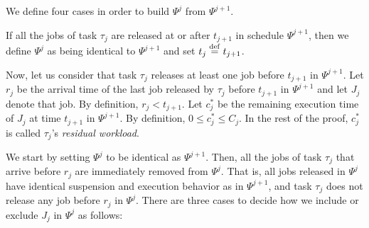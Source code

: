 
We define four cases in order to build $\Psi^j$ from $\Psi^{j+1}$.

 If all the jobs of task $\tau_j$ are released at or after $t_{j+1}$ in schedule $\Psi^{j+1}$, then we define $\Psi^j$ as being identical to $\Psi^{j+1}$ and set $t_j \stackrel{\mathrm{def}}{=} t_{j+1}$. 


Now, let us consider that  task $\tau_j$ releases at least one job before $t_{j+1}$ in $\Psi^{j+1}$. Let $r_j$ be the arrival time of the last job released by $\tau_j$ before $t_{j+1}$ in $\Psi^{j+1}$ and let $J_{j}$ denote that job. By definition, $r_j < t_{j+1}$. Let $c_j^*$ be the remaining execution time of $J_j$ at time $t_{j+1}$ in $\Psi^{j+1}$. By definition, $0 \leq c_j^* \le C_j$. In the rest of the proof, $c_j^*$ is called $\tau_j$'s \emph{residual workload}.

We start by setting $\Psi^j$ to be identical as $\Psi^{j+1}$. Then, all the jobs of task $\tau_j$ that arrive before $r_j$ are immediately removed from $\Psi^j$. That is, all jobs released in $\Psi^j$ have identical suspension and execution behavior as in $\Psi^{j+1}$, and task $\tau_j$ does not release any job before $r_j$ in $\Psi^j$. 
There are three cases to decide how we include or exclude $J_j$ in $\Psi^j$ as follows:


